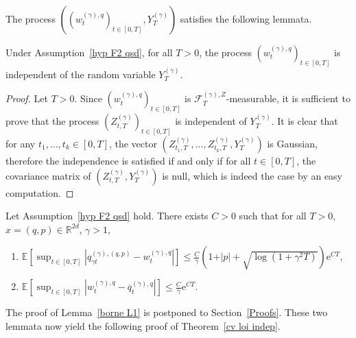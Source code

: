 \documentclass[preprint,EJP]{ejpecp}
\begin{document}
\noindent The process $((w^{(\gamma),q}_t)_{t\in[0,T]},Y_T^{(\gamma)})$ satisfies the following lemmata. \begin{lemma}[Independence]\label{lemma indep} Under Assumption~\ref{hyp F2 qsd}, for all $T>0$, the process $(w^{(\gamma),q}_t)_{t\in[0,T]}$ is independent of the random variable $Y_T^{(\gamma)}$. 
\end{lemma} 
\begin{proof}
Let $T>0$. Since $(w^{(\gamma),q}_t)_{t\in[0,T]}$ is $\mathcal{F}^{(\gamma),Z}_T$-measurable, it is sufficient to prove that the process $(Z_{t,T}^{(\gamma)})_{t\in[0,T]}$ is independent of $Y_T^{(\gamma)}$. It is clear that for any $t_1, \ldots, t_k \in [0,T]$, the vector $(Z_{t_1,T}^{(\gamma)}, \ldots, Z_{t_k,T}^{(\gamma)}, Y_T^{(\gamma)})$ is Gaussian, therefore the independence is satisfied if and only if for all $t\in[0,T]$, the covariance matrix of $(Z_{t,T}^{(\gamma)},Y_T^{(\gamma)})$ is null, which is indeed the case by an easy computation.
\end{proof}  

\begin{lemma}\label{borne L1} Let Assumption~\ref{hyp F2 qsd} hold.
There exists $C>0$ such that for all $T>0$, $x=(q,p)\in\mathbb{R}^{2d}$, $\gamma>1$,
\begin{enumerate} 
    \item\label{borne 1} $\mathbb{E}\left[\sup_{t\in[0,T]}\left\vert q^{(\gamma),(q,p)}_{\gamma t}-w^{(\gamma),q}_t\right\vert\right]\leq \frac{C}{\gamma}\left(1+\vert p\vert+ \sqrt{\log(1+\gamma^2T)}\right)\mathrm{e}^{CT}$,
    \item\label{borne 2} $\mathbb{E}\left[\sup_{t\in[0,T]}\left\vert w^{(\gamma),q}_{t}-\overline{q}^{(\gamma),q}_t\right\vert\right]\leq\frac{C}{\gamma}\mathrm{e}^{CT}$.
\end{enumerate}  
\end{lemma}
The proof of Lemma~\ref{borne L1} is postponed to Section~\ref{Proofs}. These two lemmata now yield the following proof of Theorem~\ref{cv loi indep}.
\end{document}
